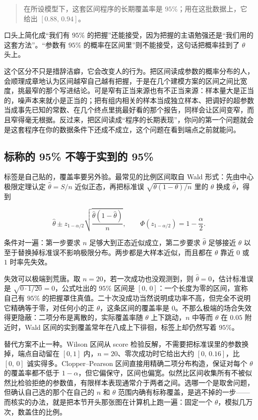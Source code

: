 \begin{quote}
在所设模型下，这套区间程序的长期覆盖率是 \(95\%\)；用在这批数据上，它给出 \([0.88,\,0.94]\)。
\end{quote}

口头上简化成``我们有 \(95\%\) 的把握''还能接受，因为把握的主语勉强还是``我们用的这套方法''。``参数有 \(95\%\) 的概率在区间里''则不能接受，这句话把概率挂到了 \(\theta\) 头上。

这个区分不只是措辞洁癖，它会改变人的行为。把区间读成参数的概率分布的人，会顺理成章地认为区间越窄自己越有把握，于是在几个建模方案的区间之间比宽度，挑最窄的那个写进结论。可是窄有正当来源也有不正当来源：样本量大是正当的，噪声本来就小是正当的；把有组内相关的样本当成独立样本、把调好的超参数当成事先已知的常数、在几个终点里挑最好看的那个报告，同样会让区间变窄，而且窄得毫无根据。反过来，把区间读成``程序的长期表现''，你问的第一个问题就会是这套程序在你的数据条件下还成不成立，这个问题在看到端点之前就能问。

\subsection{标称的 95\% 不等于实到的 95\%}

标签是自己贴的，覆盖率要另外验。最常见的比例区间取自 Wald 形式：先由中心极限定理认定 \(\hat\theta=S/n\) 近似正态，再把标准误 \(\sqrt{\theta(1-\theta)/n}\) 里的 \(\theta\) 换成 \(\hat\theta\)，得到

\[
\hat\theta\pm z_{1-\alpha/2}\sqrt{\frac{\hat\theta(1-\hat\theta)}{n}},
\qquad
\Phi(z_{1-\alpha/2})=1-\frac\alpha2 .
\]

条件对一遍：第一步要求 \(n\) 足够大到正态近似成立，第二步要求 \(\hat\theta\) 足够接近 \(\theta\) 以至于替换掉标准误不影响极限分布。两步都是大样本近似，而且都在 \(\theta\) 靠近 \(0\) 或 \(1\) 时率先失效。

失效可以极端到荒唐。取 \(n=20\)，若一次成功也没观测到，则 \(\hat\theta=0\)，估计标准误是 \(\sqrt{0\cdot 1/20}=0\)，公式吐出的 \(95\%\) 区间是 \([0,\,0]\)：一个长度为零的区间，宣称自己有 \(95\%\) 的把握罩住真值。二十次没成功当然说明成功率不高，但完全不说明它精确等于零，对任何小的正 \(\theta\)，这条区间的覆盖率是 \(0\)。不那么极端的场合失效得更隐蔽：二项分布是离散的，实际覆盖率随 \(\theta\) 上下跳动，\(n\) 中等而 \(\theta\) 在 \(0.05\) 附近时，Wald 区间的实到覆盖常年在八成上下徘徊，标签上却仍然写着 \(95\%\)。

替代方案不止一种。Wilson 区间从 score 检验反解，不需要把标准误里的参数换掉，端点自动留在 \([0,1]\) 内，\(n=20\)、零次成功时它给出大约 \([0,\,0.16]\)，比 \([0,\,0]\) 诚实得多。Clopper--Pearson 区间直接用精确二项分布构造，保证对每个 \(\theta\) 的覆盖率都不低于 \(1-\alpha\)，但它偏保守，区间也偏宽。似然比区间收集所有不被似然比检验拒绝的参数值，有限样本表现通常介于两者之间。选哪一个是取舍问题，但确认自己选的那个在自己的 \(n\) 和 \(\theta\) 范围内确有标称覆盖，是逃不掉的一步——而核实的办法，就是把本节开头那张图在计算机上跑一遍：固定一个 \(\theta\)，模拟几万次，数盖住的比例。


